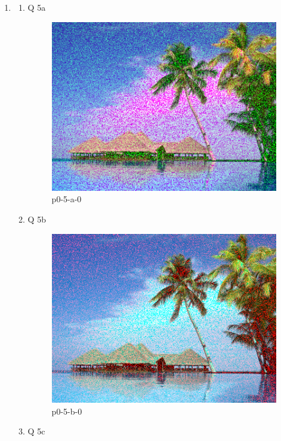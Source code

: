 \begin{enumerate}
\item
\begin{enumerate}
\item Q 5a

\begin{figure}[ht]
\centering
\includegraphics{output/p0-5-a-0}
\caption{p0-5-a-0}
\label{fig:p0-5-a-0}
\end{figure}

\item Q 5b

\begin{figure}[ht]
\centering
\includegraphics{output/p0-5-b-0}
\caption{p0-5-b-0}
\label{fig:p0-5-b-0}
\end{figure}

\item Q 5c
\end{enumerate}

\end{enumerate}



